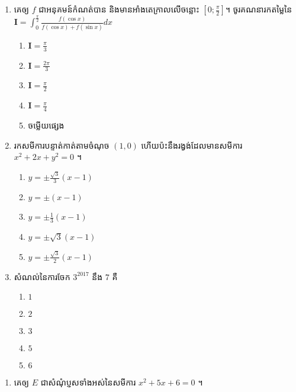 \documentclass[12pt, a4paper]{article}
\begin{document}
\begin{enumerate}[m]
	{\color{blue}\hrulefill}
	\item គេឲ្យ $f$ ជាអនុគមន៍កំណត់បាន និងមានអាំងតេក្រាលលើចន្លោះ $\left[0;\frac{\pi}{2}\right]$។ ចូរគណនារកតម្លៃនៃ $\mathbf{I}=\int_{0}^{\frac{\pi}{2}}\frac{f\left(\cos x\right)}{f\left(\cos x\right)+f\left(\sin x\right)}dx$
	\begin{enumerate}[k,5]
		\item $\mathbf{I}=\frac{\pi}{3}$
		\item $\mathbf{I}=\frac{2\pi}{3}$
		\item $\mathbf{I}=\frac{\pi}{2}$
		\item $\mathbf{I}=\frac{\pi}{4}$
		\item ចម្លើយផ្សេង
	\end{enumerate}
	{\color{blue}\hrulefill}
	\item រកសមីការបន្ទាត់កាត់តាមចំណុច $\left(1,0\right)$ ហើយប៉ះនឹងរង្វង់ដែលមានសមីការ $x^2+2x+y^2=0$ ។
	\begin{enumerate}[k,3]
		\item $y=\pm\frac{\sqrt{3}}{3}\left(x-1\right)$
		\item $y=\pm\left(x-1\right)$
		\item $y=\pm\frac{1}{3}\left(x-1\right)$
		\item $y=\pm\sqrt{3}\left(x-1\right)$
		\item $y=\pm\frac{\sqrt{3}}{2}\left(x-1\right)$
	\end{enumerate}
	{\color{blue}\hrulefill}
	\item សំណល់នៃការចែក $3^{2017}$ នឹង $7$ គឺ
	\begin{enumerate}[k,5]
		\item $1$
		\item $2$
		\item $3$
		\item $5$
		\item $6$
	\end{enumerate}
	{\color{blue}\hrulefill}
\end{enumerate}
\newpage
\maketitle
{\color{blue}\hrulefill}
\begin{enumerate}[m]
	\item គេឲ្យ $E$ ជាសំណុំប្ញសទាំងអស់នៃសមីការ $x^2+5x+6=0$ ។
\end{enumerate}
\end{document}
